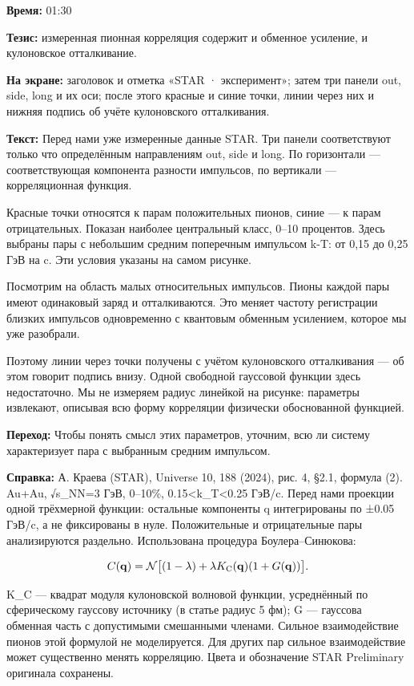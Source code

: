 \textbf{Время:} 01:30

\textbf{Тезис:} измеренная пионная корреляция содержит и обменное усиление, и кулоновское отталкивание.

\textbf{На экране:} заголовок и отметка «STAR · эксперимент»; затем три панели out, side, long и их оси; после этого красные и синие точки, линии через них и нижняя подпись об учёте кулоновского отталкивания.

\textbf{Текст:} Перед нами уже измеренные данные STAR. Три панели соответствуют только что определённым направлениям out, side и long. По горизонтали — соответствующая компонента разности импульсов, по вертикали — корреляционная функция.

Красные точки относятся к парам положительных пионов, синие — к парам отрицательных. Показан наиболее центральный класс, 0–10 процентов. Здесь выбраны пары с небольшим средним поперечным импульсом k-T: от 0,15 до 0,25 ГэВ на c. Эти условия указаны на самом рисунке.

Посмотрим на область малых относительных импульсов. Пионы каждой пары имеют одинаковый заряд и отталкиваются. Это меняет частоту регистрации близких импульсов одновременно с квантовым обменным усилением, которое мы уже разобрали.

Поэтому линии через точки получены с учётом кулоновского отталкивания — об этом говорит подпись внизу. Одной свободной гауссовой функции здесь недостаточно. Мы не измеряем радиус линейкой на рисунке: параметры извлекают, описывая всю форму корреляции физически обоснованной функцией.

\textbf{Переход:} Чтобы понять смысл этих параметров, уточним, всю ли систему характеризует пара с выбранным средним импульсом.

\textbf{Справка:} А. Краева (STAR), Universe 10, 188 (2024), рис. 4, §2.1, формула (2). Au+Au, √s\_NN=3 ГэВ, 0–10\%, 0.15<k\_T<0.25 ГэВ/c. Перед нами проекции одной трёхмерной функции: остальные компоненты q интегрированы по ±0.05 ГэВ/c, а не фиксированы в нуле. Положительные и отрицательные пары анализируются раздельно. Использована процедура Боулера–Синюкова:

\[C(\mathbf q)=\mathcal N\big[(1-\lambda)+\lambda K_{\rm C}(\mathbf q)(1+G(\mathbf q))\big].\]

K\_C — квадрат модуля кулоновской волновой функции, усреднённый по сферическому гауссову источнику (в статье радиус 5 фм); G — гауссова обменная часть с допустимыми смешанными членами. Сильное взаимодействие пионов этой формулой не моделируется. Для других пар сильное взаимодействие может существенно менять корреляцию. Цвета и обозначение STAR Preliminary оригинала сохранены.
